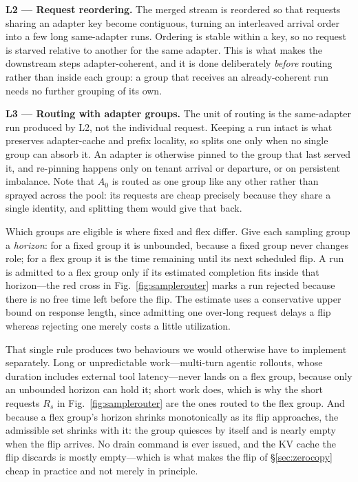 \noindent\textbf{L2 --- Request reordering.} The merged stream is reordered so that
requests sharing an adapter key become contiguous, turning an interleaved arrival order
into a few long same-adapter runs. Ordering is stable within a key, so no request is
starved relative to another for the same adapter. This is what makes the downstream steps
adapter-coherent, and it is done deliberately \emph{before} routing rather than inside each
group: a group that receives an already-coherent run needs no further grouping of its own.

\noindent\textbf{L3 --- Routing with adapter groups.} The unit of routing is the
same-adapter run produced by L2, not the individual request. Keeping a run intact is what
preserves adapter-cache and prefix locality, so \sysname splits one only when no single
group can absorb it. An adapter is otherwise pinned to the group that last served it, and
re-pinning happens only on tenant arrival or departure, or on persistent imbalance. Note
that $A_0$ is routed as one group like any other rather than sprayed across the pool: its
requests are cheap precisely because they share a single identity, and splitting them would
give that back.

Which groups are eligible is where fixed and flex differ. Give each sampling group a
\emph{horizon}: for a fixed group it is unbounded, because a fixed group never changes
role; for a flex group it is the time remaining until its next scheduled flip. A run is
admitted to a flex group only if its estimated completion fits inside that horizon---the
red cross in Fig.~\ref{fig:samplerouter} marks a run rejected because there is no free time
left before the flip. The estimate uses a conservative upper bound on response length,
since admitting one over-long request delays a flip whereas rejecting one merely costs a
little utilization.

That single rule produces two behaviours we would otherwise have to implement separately.
Long or unpredictable work---multi-turn agentic rollouts, whose duration includes external
tool latency---never lands on a flex group, because only an unbounded horizon can hold it;
short work does, which is why the short requests $R_s$ in Fig.~\ref{fig:samplerouter} are
the ones routed to the flex group. And because a flex group's horizon shrinks monotonically
as its flip approaches, the admissible set shrinks with it: the group quiesces by itself and
is nearly empty when the flip arrives. No drain command is ever issued, and the KV cache
the flip discards is mostly empty---which is what makes the flip of \S\ref{sec:zerocopy}
cheap in practice and not merely in principle.

